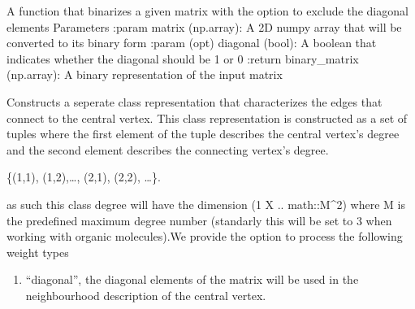 \documentclass[letterpaper,10pt,english]{sphinxmanual}
\begin{document}
\begin{fulllineitems}
\begin{fulllineitems}
\end{fulllineitems}


\begin{fulllineitems}
\label{\detokenize{modules/gqcml.data:gqcml.data.Data.Preprocessor.binarize_matrix}}
A function that binarizes a given matrix with the option to exclude the diagonal elements
Parameters
:param matrix (np.array): A 2D numpy array that will be converted to its binary form
:param (opt) diagonal (bool): A boolean that indicates whether the diagonal should be 1 or 0
:return binary\_matrix (np.array): A binary representation of the input matrix

\end{fulllineitems}


\begin{fulllineitems}
\label{\detokenize{modules/gqcml.data:gqcml.data.Data.Preprocessor.pdegree_weighted_nf}}
Constructs a seperate class representation that characterizes the edges that
connect to the central vertex. This class representation is constructed as a set of tuples
where the first element of the tuple describes the central vertex’s degree and the second element
describes the connecting vertex’s degree.

\{(1,1), (1,2),…, (2,1), (2,2), …\}.

as such this class degree will have the dimension (1 X .. math::M\textasciicircum{}2) where M is the predefined maximum degree number
(standarly this will be set to 3 when working with organic molecules).We provide the option to process the
following weight types
\begin{enumerate}
%
\item {} 
“diagonal”, the diagonal elements of the matrix will be used in the neighbourhood description
of the central vertex.


\end{enumerate}
\end{fulllineitems}
\end{fulllineitems}
\end{document}
